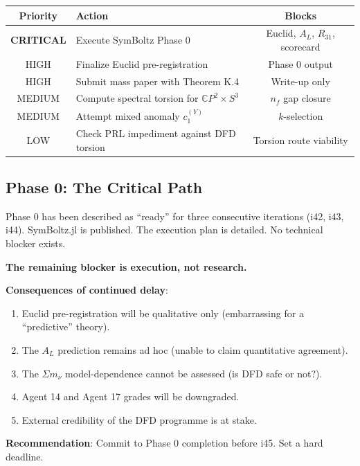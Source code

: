 \documentclass[11pt,a4paper]{article}
\newcommand{\CP}{\mathbb{C}P}
\begin{document}
\begin{center}
\begin{tabular}{clc}
\toprule
\textbf{Priority} & \textbf{Action} & \textbf{Blocks} \\
\midrule
\textbf{CRITICAL} & Execute SymBoltz Phase 0 & Euclid, $A_L$, $R_{31}$, scorecard \\
HIGH & Finalize Euclid pre-registration & Phase 0 output \\
HIGH & Submit mass paper with Theorem K.4 & Write-up only \\
MEDIUM & Compute spectral torsion for $\CP^2 \times S^3$ & $n_f$ gap closure \\
MEDIUM & Attempt mixed anomaly $c_1^{(Y)}$ & $k$-selection \\
LOW & Check PRL impediment against DFD torsion & Torsion route viability \\
\bottomrule
\end{tabular}
\end{center}

\subsection{Phase 0: The Critical Path}

\begin{tcolorbox}[colback=red!5!white, colframe=red!60!black,
  title={HONEST ASSESSMENT: Phase 0 is Now the Programme's Credibility Test}]

Phase 0 has been described as ``ready'' for three consecutive iterations (i42, i43, i44). SymBoltz.jl is published. The execution plan is detailed. No technical blocker exists.

\textbf{The remaining blocker is execution, not research.}

\textbf{Consequences of continued delay}:
\begin{enumerate}
\item Euclid pre-registration will be qualitative only (embarrassing for a ``predictive'' theory).
\item The $A_L$ prediction remains ad hoc (unable to claim quantitative agreement).
\item The $\Sigma m_\nu$ model-dependence cannot be assessed (is DFD safe or not?).
\item Agent 14 and Agent 17 grades will be downgraded.
\item External credibility of the DFD programme is at stake.
\end{enumerate}

\textbf{Recommendation}: Commit to Phase 0 completion before i45. Set a hard deadline.
\end{tcolorbox}
\end{document}
